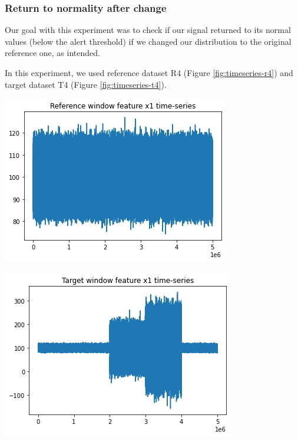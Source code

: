 \subsubsection{Return to normality after change}
Our goal with this experiment was to check if our signal returned to its normal values (below the alert threshold) if we changed our distribution to the original reference one, as intended.

In this experiment, we used reference dataset R4 (Figure \ref{fig:timeseries-r4}) and target dataset T4 (Figure \ref{fig:timeseries-t4}). 
\begin{center}
\begin{minipage}{.5\textwidth}
  \centering
  \includegraphics[width=1\linewidth]{figures/timeseries-r4.png}
  \label{fig:timeseries-r4}
\end{minipage}%
\begin{minipage}{.5\textwidth}
  \centering
  \includegraphics[width=1\linewidth]{figures/timeseries-t4.png}
  \label{fig:timeseries-t4}
\end{minipage}
\end{center}

